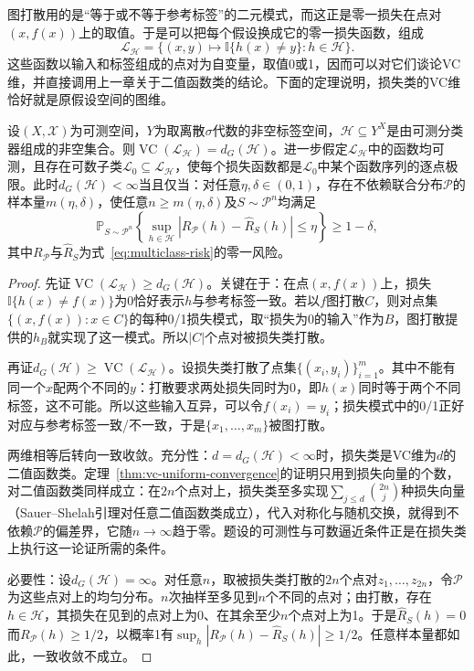 图打散用的是“等于或不等于参考标签”的二元模式，而这正是零一损失在点对$(x,f(x))$上的取值。于是可以把每个假设换成它的零一损失函数，组成
\[
 \mathcal L_{\mathcal H}=\{(x,y)\mapsto\mathbb I\{h(x)\neq y\}:h\in\mathcal H\}.
\]
这些函数以输入和标签组成的点对为自变量，取值0或1，因而可以对它们谈论VC维，并直接调用上一章关于二值函数类的结论。下面的定理说明，损失类的VC维恰好就是原假设空间的图维。

\begin{theorem}[图维与一致收敛]
\label{thm:graph-uniform-convergence}
设$(X,\mathcal X)$为可测空间，$Y$为取离散$\sigma$代数的非空标签空间，$\mathcal H\subseteq Y^X$是由可测分类器组成的非空集合。则$\operatorname{VC}(\mathcal L_{\mathcal H})=d_G(\mathcal H)$。进一步假定$\mathcal L_{\mathcal H}$中的函数均可测，且存在可数子类$\mathcal L_0\subseteq\mathcal L_{\mathcal H}$，使每个损失函数都是$\mathcal L_0$中某个函数序列的逐点极限。此时$d_G(\mathcal H)<\infty$当且仅当：对任意$\eta,\delta\in(0,1)$，存在不依赖联合分布$\mathcal P$的样本量$m(\eta,\delta)$，使任意$n\geq m(\eta,\delta)$及$S\sim\mathcal P^n$均满足
\[
 \mathbb P_{S\sim\mathcal P^n}\left\{
 \sup_{h\in\mathcal H}|R_{\mathcal P}(h)-\hat R_S(h)|\leq\eta
 \right\}\geq1-\delta,
\]
其中$R_{\mathcal P}$与$\hat R_S$为式~\eqref{eq:multiclass-risk}的零一风险。
\end{theorem}

\begin{proof}
先证$\operatorname{VC}(\mathcal L_{\mathcal H})\geq d_G(\mathcal H)$。关键在于：在点$(x,f(x))$上，损失$\mathbb I\{h(x)\neq f(x)\}$为0恰好表示$h$与参考标签一致。若以$f$图打散$C$，则对点集$\{(x,f(x)):x\in C\}$的每种0/1损失模式，取“损失为0的输入”作为$B$，图打散提供的$h_B$就实现了这一模式。所以$|C|$个点对被损失类打散。

再证$d_G(\mathcal H)\geq\operatorname{VC}(\mathcal L_{\mathcal H})$。设损失类打散了点集$\{(x_i,y_i)\}_{i=1}^m$。其中不能有同一个$x$配两个不同的$y$：打散要求两处损失同时为0，即$h(x)$同时等于两个不同标签，这不可能。所以这些输入互异，可以令$f(x_i)=y_i$；损失模式中的0/1正好对应与参考标签一致/不一致，于是$\{x_1,\ldots,x_m\}$被图打散。

两维相等后转向一致收敛。充分性：$d=d_G(\mathcal H)<\infty$时，损失类是VC维为$d$的二值函数类。定理~\ref{thm:vc-uniform-convergence}的证明只用到损失向量的个数，对二值函数类同样成立：在$2n$个点对上，损失类至多实现$\sum_{j\leq d}\binom{2n}j$种损失向量（Sauer--Shelah引理对任意二值函数类成立），代入对称化与随机交换，就得到不依赖$\mathcal P$的偏差界，它随$n\to\infty$趋于零。题设的可测性与可数逼近条件正是在损失类上执行这一论证所需的条件。

必要性：设$d_G(\mathcal H)=\infty$。对任意$n$，取被损失类打散的$2n$个点对$z_1,\ldots,z_{2n}$，令$\mathcal P$为这些点对上的均匀分布。$n$次抽样至多见到$n$个不同的点对；由打散，存在$h\in\mathcal H$，其损失在见到的点对上为0、在其余至少$n$个点对上为1。于是$\hat R_S(h)=0$而$R_{\mathcal P}(h)\geq1/2$，以概率1有$\sup_h|R_{\mathcal P}(h)-\hat R_S(h)|\geq1/2$。任意样本量都如此，一致收敛不成立。
\end{proof}

